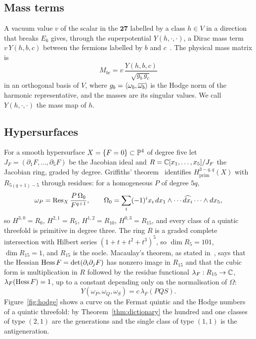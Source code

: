 \subsection{Mass terms}

A vacuum value $v$ of the scalar in the $\mathbf{27}$ labelled by a class
$h\in V$ in a direction that breaks $E_6$ gives, through the superpotential
$Y(h,\cdot,\cdot)$, a Dirac mass term $v\,Y(h,b,c)$ between the fermions
labelled by $b$ and $c$~\cite{Wit85}. The physical mass matrix is
\begin{equation}\label{eq:massmatrix}
M_{bc}=v\,\frac{Y(h,b,c)}{\sqrt{g_{b}\,g_{c}}}
\end{equation}
in an orthogonal basis of $V$, where $g_b=\langle \omega_b,\overline{\omega_b}\rangle$
is the Hodge norm of the harmonic representative, and the masses are its
singular values. We call $Y(h,\cdot,\cdot)$ the mass map of $h$.

\subsection{Hypersurfaces}

For a smooth hypersurface $X=\{F=0\}\subset\mathbb{P}^4$ of degree five let
$J_F=(\partial_1F,\dots,\partial_5F)$ be the Jacobian ideal and
$R=\mathbb{C}[x_1,\dots,x_5]/J_F$ the Jacobian ring, graded by degree. Griffiths'
theorem~\cite{Gri69} identifies $H^{3-q,q}_{\mathrm{prim}}(X)$ with
$R_{5(q+1)-5}$ through residues: for a homogeneous $P$ of degree $5q$,
\[
\omega_P=\operatorname{Res}_X\frac{P\,\Omega_0}{F^{q+1}},\qquad
\Omega_0=\sum_i(-1)^{i}x_i\,dx_1\wedge\cdots\widehat{dx_i}\cdots\wedge dx_5,
\]
so $H^{3,0}=R_0$, $H^{2,1}=R_5$, $H^{1,2}=R_{10}$, $H^{0,3}=R_{15}$, and
every class of a quintic threefold is primitive in degree three. The ring
$R$ is a graded complete intersection with Hilbert series
$(1+t+t^2+t^3)^5$, so $\dim R_5=101$, $\dim R_{15}=1$, and $R_{15}$ is the
socle. Macaulay's theorem, as stated in~\cite{CG80}, says that the Hessian
$\operatorname{Hess} F=\det(\partial_i\partial_jF)$ has nonzero image in $R_{15}$ and
that the cubic form is multiplication in $R$ followed by the residue
functional $\lambda_F:R_{15}\to\mathbb{C}$, $\lambda_F(\operatorname{Hess} F)=1$, up to a
constant depending only on the normalisation of $\Omega$:
\begin{equation}\label{eq:jacobianyukawa}
Y(\omega_P,\omega_Q,\omega_S)=c\,\lambda_F(PQS).
\end{equation}
Figure~\ref{fig:hodge} shows a curve on the Fermat quintic and the Hodge
numbers of a quintic threefold: by Theorem~\ref{thm:dictionary} the hundred and one classes
of type $(2,1)$ are the generations and the single class of type $(1,1)$
is the antigeneration.


